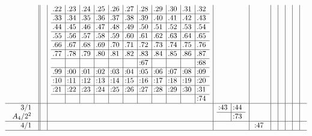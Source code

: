 \documentclass[12pt,a4paper]{amsart}
\begin{document}
\begin{align*}
\begin{array}{r||c|c|c|c|c|c|c|c|c}
&&
\begin{array}{r|r|r|r|r|r|r|r|r|r|r}%
\llap.22&\llap.23&\llap.24&\llap.25&\llap.26&\llap.27&\llap.28&\llap.29&\llap.30&\llap.31&\llap.32\\%
\hline
\llap.33&\llap.34&\llap.35&\llap.36&\llap.37&\llap.38&\llap.39&\llap.40&\llap.41&\llap.42&\llap.43\\%
\hline
\llap.44&\llap.45&\llap.46&\llap.47&\llap.48&\llap.49&\llap.50&\llap.51&\llap.52&\llap.53&\llap.54\\%
\hline
\llap.55&\llap.56&\llap.57&\llap.58&\llap.59&\llap.60&\llap.61&\llap.62&\llap.63&\llap.64&\llap.65\\%
\hline
\llap.66&\llap.67&\llap.68&\llap.69&\llap.70&\llap.71&\llap.72&\llap.73&\llap.74&\llap.75&\llap.76\\%
\hline
\llap.77&\llap.78&\llap.79&\llap.80&\llap.81&\llap.82&\llap.83&\llap.84&\llap.85&\llap.86&\llap.87\\%
\hline
&&&&&&\llap:67&&&&\llap:68\\%
\hline
\llap.99&\llap:00&\llap:01&\llap:02&\llap:03&\llap:04&\llap:05&\llap:06&\llap:07&\llap:08&\llap:09\\%
\hline
\llap:10&\llap:11&\llap:12&\llap:13&\llap:14&\llap:15&\llap:16&\llap:17&\llap:18&\llap:19&\llap:20\\%
\hline
\llap:21&\llap:22&\llap:23&\llap:24&\llap:25&\llap:26&\llap:27&\llap:28&\llap:29&\llap:30&\llap:31\\%
\hline
&&&&&&&&&&\llap:74\\%
\end{array}
&&&&&&&\\
\hline
    \begin{array}{r}
      3/1 \\ A_4/2^2 \\
    \end{array}
&&&
\begin{array}{r|r}%
\llap:43&\llap:44\\%
\hline
&\llap:73\\%
\end{array}
&&&&&&\\
\hline
    \begin{array}{r}
      4/1 \\
    \end{array}
&&&&
\begin{array}{r}%
\llap:47\\%
\end{array}
&&&&&\\
\hline

\end{array}
\end{align*}
\end{document}
